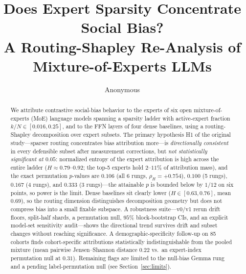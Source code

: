 \documentclass[sigconf]{acmart}
\begin{document}
\title{Does Expert Sparsity Concentrate Social Bias?\\
  A Routing-Shapley Re-Analysis of Mixture-of-Experts LLMs}

\author{Anonymous}
\email{}

\graphicspath{{../figures/}}

\newcommand{\takeaway}[1]{%
\par\medskip\noindent
\fbox{\begin{minipage}[c]{\dimexpr\linewidth-2\fboxsep-2\fboxrule\relax}%
\textbf{Take-away.}~#1\end{minipage}}\par\medskip}

\begin{abstract}
We attribute contrastive social-bias behavior to the experts of six open
mixture-of-experts (MoE) language models spanning a sparsity ladder with
active-expert fraction $k/N \in [0.016, 0.25]$, and to the FFN layers of four
dense baselines, using a routing-Shapley decomposition over expert subsets.
The primary hypothesis H1 of the original study---sparser routing
concentrates bias attribution more---is \emph{directionally consistent} in
every defensible subset after measurement corrections, but \emph{not
statistically significant at $0.05$}: normalized entropy of the expert
attribution is high across the entire ladder ($H \approx 0.79$--$0.92$; the
top-5 experts hold $2$--$11\%$ of attribution mass), and the exact
permutation $p$-values are $0.106$ (all 6 rungs, $\rho_H = +0.754$), $0.100$
(5 rungs), $0.167$ (4 rungs), and $0.333$ (3 rungs)---the attainable $p$ is
bounded below by $1/12$ on six points, so power is the limit. Dense
baselines sit clearly lower ($H \in [0.63, 0.76]$, mean $0.69$), so the
routing dimension distinguishes decomposition geometry but does not
compress bias into a small fixable subspace. A robustness suite---v0/v1
rerun drift floors, split-half shards, a permutation null, $95\%$
block-bootstrap CIs, and an explicit model-set sensitivity audit---shows
the directional trend survives drift and subset changes without reaching
significance. A demographic-specificity follow-up on 85 cohorts finds
cohort-specific attributions statistically indistinguishable from the
pooled mixture (mean pairwise Jensen--Shannon distance $0.22$ vs.\ an
expert-index permutation null at $0.31$). Remaining flags are limited to
the null-bias Gemma rung and a pending label-permutation null (see
Section~\ref{sec:limits}).
\end{abstract}
\end{document}
